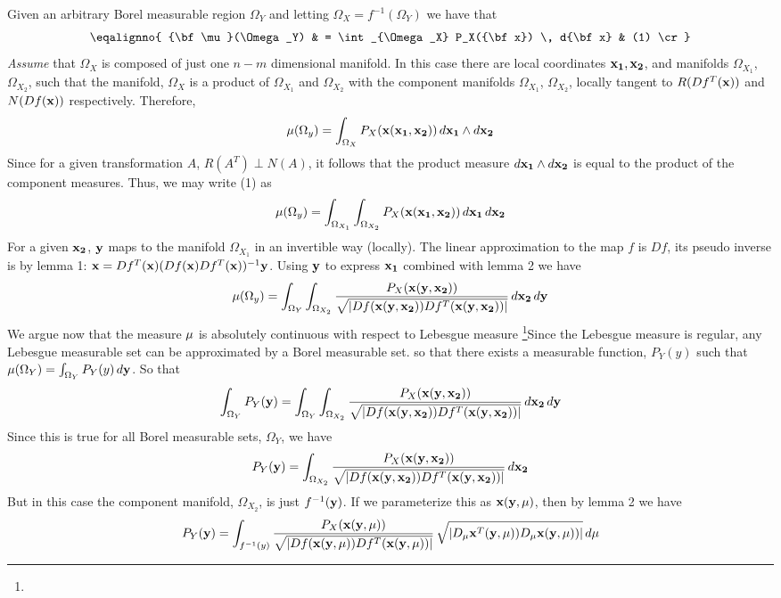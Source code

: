 Given an arbitrary Borel measurable region $\Omega_Y$ and letting
$\Omega_X = f^{-1}(\Omega_Y)$ we have that
$$
\eqalignno{
{\bf \mu}(\Omega_Y) & = 
\int_{\Omega_X} P_X({\bf x}) \, d{\bf x} & (1) \cr
}
$$
{\it Assume\/} that $\Omega_X$ is composed of just one $n-m$ dimensional
manifold. In this case there are local coordinates ${\bf x_1}, {\bf x_2}$, 
and manifolds $\Omega_{X_1}$, $\Omega_{X_2}$, such that the manifold, 
$\Omega_X$ is a product of $\Omega_{X_1}$ and $\Omega_{X_2}$ with
the component manifolds $\Omega_{X_1}$, $\Omega_{X_2}$, 
locally tangent to $R(Df^T({\bf x}))$ and $N(Df({\bf x}))$ respectively.
Therefore,
$$
{\bf \mu}(\Omega_y) = 
\int_{\Omega_X} P_X({\bf x}({\bf x_1}, {\bf x_2})) \, 
d{\bf x_1} \wedge d{\bf x_2}
$$
Since for a given transformation $A$, $R(A^T) \perp N(A)$, it follows
that the product measure $d{\bf x_1} \wedge d{\bf x_2}$ is equal to 
the product of the component measures.
Thus, we may write (1) as 
$$
{\bf \mu}(\Omega_y) = 
\int_{\Omega_{X_1}} \int_{\Omega_{X_2}} 
P_X({\bf x}({\bf x_1}, {\bf x_2})) \, d{\bf x_1} \, d{\bf x_2}
$$
For a given ${\bf x_2}$, ${\bf y}$ maps to the manifold $\Omega_{X_1}$ in an 
invertible way (locally). The linear approximation to the map $f$ is $Df$, its
pseudo inverse is by lemma 1:
${\bf x} = Df^T({\bf x}) (Df({\bf x}) Df^T({\bf x}))^{-1} {\bf y}$.
Using ${\bf y}$ to express ${\bf x_1}$ combined with lemma 2 we have
$$
{\bf \mu}(\Omega_y) = 
\int_{\Omega_Y} \int_{\Omega_{X_2}} 
{P_X({\bf x}({\bf y}, {\bf x_2})) \over 
\sqrt{ |Df({\bf x}({\bf y}, {\bf x_2})) Df^T({\bf x}({\bf y}, {\bf x_2}))| } }
\, d{\bf x_2} \, d{\bf y}
$$
We argue now that the measure ${\bf \mu}$ is absolutely continuous with 
respect to Lebesgue measure%
\footnote{\raise 2pt \hbox{\ddag}}{Since the Lebesgue measure is regular, any Lebesgue measurable set can be approximated by a Borel measurable set.} 
so that there exists a measurable function, $P_Y(y)$
such that $\mu(\Omega_Y) = \int_{\Omega_Y} P_Y(y) \, d{\bf y}$.
So that
$$
\int_{\Omega_Y} P_Y({\bf y}) =
\int_{\Omega_Y} \int_{\Omega_{X_2}} 
{P_X({\bf x}({\bf y}, {\bf x_2})) \over 
\sqrt{ |Df({\bf x}({\bf y}, {\bf x_2})) Df^T({\bf x}({\bf y}, {\bf x_2}))| } }
\, d{\bf x_2} \, d{\bf y}
$$
Since this is true for all Borel measurable sets, $\Omega_Y$, we have
$$
P_Y({\bf y}) =
\int_{\Omega_{X_2}} 
{P_X({\bf x}({\bf y}, {\bf x_2})) \over 
\sqrt{ |Df({\bf x}({\bf y}, {\bf x_2})) Df^T({\bf x}({\bf y}, {\bf x_2}))| } }
\,  d{\bf x_2}
$$
But in this case the component manifold, $\Omega_{X_2}$, is just $f^{-1}({\bf y})$.
If we parameterize this as ${\bf x}({\bf y}, {\bf \mu})$, then by lemma 2 we
have
$$
P_Y({\bf y}) =
\int_{f^{-1}(y)}
{P_X({\bf x}({\bf y}, {\bf \mu})) \over 
\sqrt{ |Df({\bf x}({\bf y}, {\bf \mu})) Df^T({\bf x}({\bf y}, {\bf \mu})) | } }
\,  \sqrt{|D_{{\bf \mu}}{\bf x}^T({\bf y}, {\bf \mu})) 
D_{{\bf \mu}}{\bf x}({\bf y}, {\bf \mu})) | } \, d{\bf \mu}
$$

